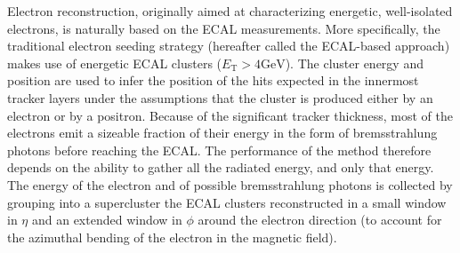 Electron reconstruction, originally aimed at characterizing energetic, well-isolated electrons, is naturally based on the ECAL measurements. More specifically, the traditional electron seeding strategy (hereafter called the ECAL-based approach) \cite{2015} makes use of energetic ECAL clusters ($E_{\mathrm{T}}>4 \mathrm{GeV}$).  The cluster energy and position are used to infer the position of the hits expected in the innermost tracker layers under the assumptions that the cluster is produced either by an electron or by a positron.  Because of the significant tracker thickness, most of the electrons emit a sizeable fraction of their energy in the form of bremsstrahlung photons before reaching the ECAL. The performance of the method therefore depends on the ability to gather all the radiated energy, and only that energy.  The energy of the electron and of possible bremsstrahlung photons is collected by grouping into a supercluster the ECAL clusters reconstructed in a small window in $\eta$ and an extended window in $\phi$ around the electron direction (to account for the azimuthal bending of the electron in the magnetic field).

